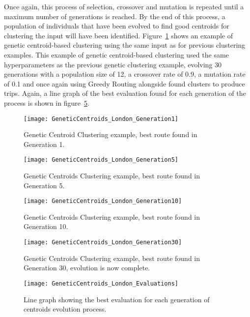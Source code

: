 \noindent
Once again, this process of selection, crossover and mutation is repeated until a maximum number of generations is reached.
By the end of this process, a population of individuals that have been evolved to find good centroids for clustering the
input will have been identified.
Figure~\ref{fig:GeneticCentroids_London_Generation1} shows an example of genetic centroid-based clustering using the same
input as for previous clustering examples.
This example of genetic centroid-based clustering used the same hyperparameters as the previous genetic clustering
example, evolving 30 generations with a population size of 12, a crossover rate of 0.9, a mutation rate of 0.1 and
once again using Greedy Routing alongside found clusters to produce trips.
Again, a line graph of the best evaluation found for each generation of the process is shown in
figure~\ref{fig:GeneticCentroids_London_Evaluations}.
\begin{figure}[H]
    \ContinuedFloat*
    \centering
    \texttt{[image: GeneticCentroids\_London\_Generation1]}
    \caption{Genetic Centroid Clustering example, best route found in Generation 1.}
    \label{fig:GeneticCentroids_London_Generation1}
\end{figure}
\begin{figure}[H]
    \ContinuedFloat
    \centering
    \texttt{[image: GeneticCentroids\_London\_Generation5]}
    \caption{Genetic Centroids Clustering example, best route found in Generation 5.}
    \label{fig:GeneticCentroids_London_Generation5}
\end{figure}
\begin{figure}[H]
    \ContinuedFloat
    \centering
    \texttt{[image: GeneticCentroids\_London\_Generation10]}
    \caption{Genetic Centroids Clustering example, best route found in Generation 10.}
    \label{fig:GeneticCentroids_London_Generation10}
\end{figure}
\begin{figure}[H]
    \ContinuedFloat
    \centering
    \texttt{[image: GeneticCentroids\_London\_Generation30]}
    \caption{Genetic Centroids Clustering example, best route found in Generation 30, evolution is now complete.}
    \label{fig:GeneticCentroids_London_Generation30}
\end{figure}
\begin{figure}[H]
    \centering
    \texttt{[image: GeneticCentroids\_London\_Evaluations]}
    \caption{Line graph showing the best evaluation for each generation of centroids evolution process.}
    \label{fig:GeneticCentroids_London_Evaluations}
\end{figure}
\noindent

